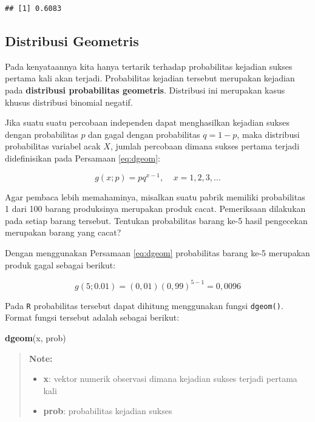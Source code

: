 \documentclass[]{book}
\newenvironment{Shaded}{\begin{snugshade}}{\end{snugshade}}
\newcommand{\KeywordTok}[1]{\textcolor[rgb]{0.13,0.29,0.53}{\textbf{#1}}}
\newcommand{\NormalTok}[1]{#1}
\providecommand{\tightlist}{%
  \setlength{\itemsep}{0pt}\setlength{\parskip}{0pt}}
\begin{document}
\begin{verbatim}
## [1] 0.6083
\end{verbatim}

\subsection{Distribusi Geometris}\label{distribusi-geometris}

Pada kenyataannya kita hanya tertarik terhadap probabilitas kejadian
sukses pertama kali akan terjadi. Probabilitas kejadian tersebut
merupakan kejadian pada \textbf{distribusi probabilitas geometris}.
Distribusi ini merupakan kasus khusus distribusi binomial negatif.

Jika suatu suatu percobaan independen dapat menghasilkan kejadian sukses
dengan probabilitas \(p\) dan gagal dengan probabilitas \(q=1-p\), maka
distribusi probabilitas variabel acak \(X\), jumlah percobaan dimana
sukses pertama terjadi didefinisikan pada Persamaan \eqref{eq:dgeom}:

\begin{equation}
   g\left(x;p\right)=pq^{x-1},\ \ \ \ \ x=1,2,3,...
  \label{eq:dgeom}
\end{equation}

Agar pembaca lebih memahaminya, misalkan suatu pabrik memiliki
probabilitas 1 dari 100 barang produksinya merupakan produk cacat.
Pemeriksaan dilakukan pada setiap barang tersebut. Tentukan probabilitas
barang ke-5 hasil pengecekan merupakan barang yang cacat?

Dengan menggunakan Persamaan \eqref{eq:dgeom} probabilitas barang ke-5
merupakan produk gagal sebagai berikut:

\[
g\left(5;0.01\right)=\left(0,01\right)\left(0,99\right)^{5-1}=0,0096
\]

Pada \texttt{R} probabilitas tersebut dapat dihitung menggunakan fungsi
\texttt{dgeom()}. Format fungsi tersebut adalah sebagai berikut:

\begin{Shaded}
\begin{Highlighting}[]
\KeywordTok{dgeom}\NormalTok{(x, prob)}
\end{Highlighting}
\end{Shaded}

\begin{quote}
\textbf{Note: }

\begin{itemize}
\tightlist
\item
  \textbf{x}: vektor numerik observasi dimana kejadian sukses terjadi
  pertama kali
\item
  \textbf{prob}: probabilitas kejadian sukses
\end{itemize}
\end{quote}
\end{document}

